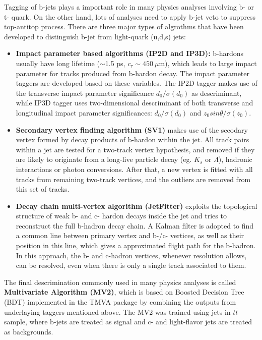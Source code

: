Tagging of b-jets plays a important role in many physics analyses involving b- or t- quark.
On the other hand, lots of analyses need to apply b-jet veto to suppress top-antitop process.
There are three major types of algrothms that have been developed to distinguish b-jet from light-quark (u,d,s) jets\cite{ATL-PHYS-PUB-2016-012}:
\begin{itemize}
	\item \textbf{Impact parameter based algorithms (IP2D and IP3D):} b-hardons usually have long lifetime ($\sim$1.5 ps, $c_{\tau}\sim450~\mu$m), which leads to large impact parameter for tracks produced from b-hardon decay. The impact parameter taggers are developed based on these variables. The IP2D tagger makes use of the transverse impact parameter significance $d_{0}/\sigma(d_{0})$ as descriminant, while IP3D tagger uses two-dimensional descriminant of both transverse and longitudinal impact parameter significances: $d_{0}/\sigma(d_{0})$ and $z_{0}sin\theta/\sigma(z_{0})$.
	\item \textbf{Secondary vertex finding algorithm (SV1)} makes use of the secodary vertex formed by decay products of b-hardon within the jet. All track pairs within a jet are tested for a two-track vertex hypothesis, and removed if they are likely to originate from a long-live particle decay (eg. $K_{s}$ or $\Lambda$), hadronic interactions or photon conversions. After that, a new vertex is fitted with all tracks from remaining two-track vertices, and the outliers are removed from this set of tracks.
	\item \textbf{Decay chain multi-vertex algorithm (JetFitter)}\cite{Piacquadio_2008} exploits the topological structure of weak b- and c- hardon decays inside the jet and tries to reconstruct the full b-hadron decay chain. A Kalman filter is adopted to find a common line between primary vertex and b-/c- vertices, as well as their position in this line, which gives a approximated flight path for the b-hadron. In this approach, the b- and c-hadron vertices, whenever resolution allows, can be resolved, even when there is only a single track associated to them.
\end{itemize}
The final descrimination commonly used in many physics analyses is called \textbf{Multivariate Algorithm (MV2)}, which is based on Boosted Decision Tree (BDT) implemented in the TMVA package\cite{Speckmayer_2010} by combining the outputs from underlaying taggers mentioned above.
The MV2 was trained using jets in $t\bar{t}$ sample, where b-jets are treated as signal and c- and light-flavor jets are treated as backgrounds.
